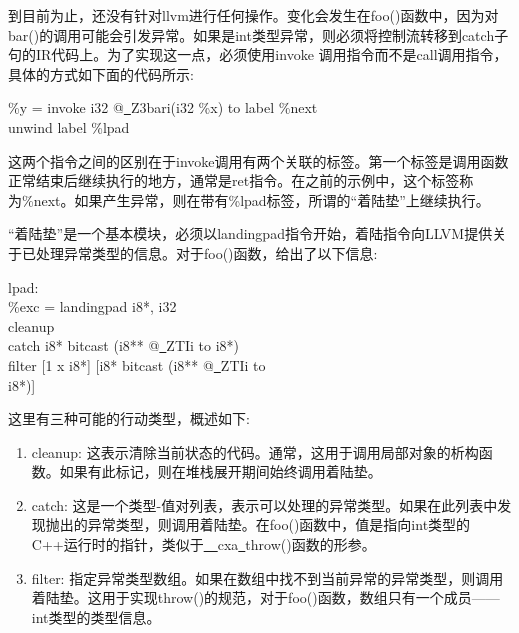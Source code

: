 到目前为止，还没有针对llvm进行任何操作。变化会发生在foo()函数中，因为对bar()的调用可能会引发异常。如果是int类型异常，则必须将控制流转移到catch子句的IR代码上。为了实现这一点，必须使用invoke 调用指令而不是call调用指令，具体的方式如下面的代码所示:\par

\begin{tcolorbox}[colback=white,colframe=black]
\%y = invoke i32 @\underline{~}Z3bari(i32 \%x) to label \%next \\
\hspace*{6cm}unwind label \%lpad
\end{tcolorbox}

这两个指令之间的区别在于invoke调用有两个关联的标签。第一个标签是调用函数正常结束后继续执行的地方，通常是ret指令。在之前的示例中，这个标签称为\%next。如果产生异常，则在带有\%lpad标签，所谓的“着陆垫”上继续执行。\par

“着陆垫”是一个基本模块，必须以landingpad指令开始，着陆指令向LLVM提供关于已处理异常类型的信息。对于foo()函数，给出了以下信息:\par

\begin{tcolorbox}[colback=white,colframe=black]
lpad: \\
\%exc = landingpad { i8*, i32 } \\
\hspace*{3cm}cleanup \\
\hspace*{3cm}catch i8* bitcast (i8** @\underline{~}ZTIi to i8*) \\
\hspace*{3cm}filter [1 x i8*] [i8* bitcast (i8** @\underline{~}ZTIi to  \\
\hspace*{3.5cm}i8*)]
\end{tcolorbox}

这里有三种可能的行动类型，概述如下:\par

\begin{enumerate}
\item cleanup: 这表示清除当前状态的代码。通常，这用于调用局部对象的析构函数。如果有此标记，则在堆栈展开期间始终调用着陆垫。

\item catch: 这是一个类型-值对列表，表示可以处理的异常类型。如果在此列表中发现抛出的异常类型，则调用着陆垫。在foo()函数中，值是指向int类型的C++运行时的指针，类似于\underline{~~}cxa\underline{~}throw()函数的形参。
	
\item filter: 指定异常类型数组。如果在数组中找不到当前异常的异常类型，则调用着陆垫。这用于实现throw()的规范，对于foo()函数，数组只有一个成员——int类型的类型信息。
\end{enumerate}

